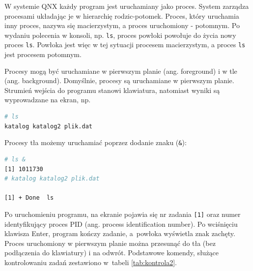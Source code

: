 \documentclass[11pt,twoside,a4paper]{article}
\begin{document}
W systemie QNX każdy program jest uruchamiany jako proces. System zarządza procesami układając je w hierarchię rodzic-potomek. Proces, który uruchamia inny proces, nazywa się macierzystym, a proces uruchomiony - potomnym. Po wydaniu polecenia w konsoli, np. \lstinline{ls}, proces powłoki powołuje do życia nowy proces \lstinline{ls}. Powłoka jest więc w tej sytuacji procesem macierzystym, a proces \lstinline{ls} jest procesem potomnym.


\begin{example}

Procesy mogą być uruchamiane w pierwszym planie (ang. foreground) i w tle (ang. background). Domyślnie, procesy są uruchamiane w pierwszym planie. Strumień wejścia do programu stanowi klawiatura, natomiast wyniki są wyprowadzane na ekran, np.

\begin{lstlisting}[language=bash]
# ls
katalog katalog2 plik.dat
\end{lstlisting}

Procesy tła możemy uruchamiać poprzez dodanie znaku (\lstinline{&}):

\begin{lstlisting}[language=bash]
# ls &
[1] 1011730
# katalog katalog2 plik.dat

[1] + Done	ls
\end{lstlisting}

Po uruchomieniu programu, na ekranie pojawia się nr zadania \lstinline{[1]} oraz numer identyfikujący proces PID (ang. process identification number). Po wciśnięciu klawisza Enter, program kończy zadanie, a~powłoka wyświetla znak zachęty. 
Proces uruchomiony w pierwszym planie można przesunąć do tła (bez podłączenia do klawiatury) i na odwrót. Podstawowe komendy, służące kontrolowaniu zadań zestawiono w~tabeli \ref{tab:kontrola2}.


\end{example}
\end{document}
